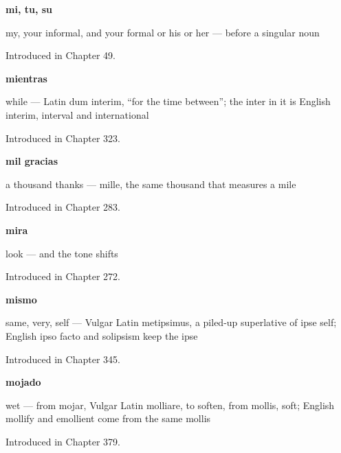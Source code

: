 \noindent\begin{minipage}[t]{\linewidth}
\raggedright
\textbf{mi, tu, su}\par
\small my, your informal, and your formal or his or her — before a singular noun\par
\footnotesize Introduced in Chapter 49.
\end{minipage}\par\medskip

\noindent\begin{minipage}[t]{\linewidth}
\raggedright
\textbf{mientras}\par
\small while — Latin dum interim, \textquotedblleft{}for the time between\textquotedblright{}; the inter in it is English interim, interval and international\par
\footnotesize Introduced in Chapter 323.
\end{minipage}\par\medskip

\noindent\begin{minipage}[t]{\linewidth}
\raggedright
\textbf{mil gracias}\par
\small a thousand thanks — mille, the same thousand that measures a mile\par
\footnotesize Introduced in Chapter 283.
\end{minipage}\par\medskip

\noindent\begin{minipage}[t]{\linewidth}
\raggedright
\textbf{mira}\par
\small look — and the tone shifts\par
\footnotesize Introduced in Chapter 272.
\end{minipage}\par\medskip

\noindent\begin{minipage}[t]{\linewidth}
\raggedright
\textbf{mismo}\par
\small same, very, self — Vulgar Latin metipsimus, a piled-up superlative of ipse self; English ipso facto and solipsism keep the ipse\par
\footnotesize Introduced in Chapter 345.
\end{minipage}\par\medskip

\noindent\begin{minipage}[t]{\linewidth}
\raggedright
\textbf{mojado}\par
\small wet — from mojar, Vulgar Latin molliare, to soften, from mollis, soft; English mollify and emollient come from the same mollis\par
\footnotesize Introduced in Chapter 379.
\end{minipage}\par\medskip

